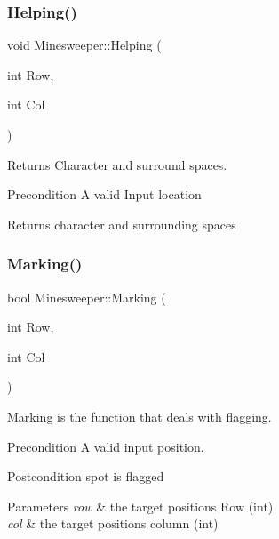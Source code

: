 \subsubsection{\texorpdfstring{Helping()}{Helping()}}
{\footnotesize\ttfamily void Minesweeper\+::\+Helping (\begin{DoxyParamCaption}\item[{int}]{Row,  }\item[{int}]{Col }\end{DoxyParamCaption})}



Returns Character and surround spaces. 

\begin{DoxyPrecond}{Precondition}
A valid Input location 
\end{DoxyPrecond}
\begin{DoxyReturn}{Returns}
character and surrounding spaces 
\end{DoxyReturn}
\mbox{\label{class_minesweeper_a8ac0c88846a50058ac722e4e9df5afaa}} 
\subsubsection{\texorpdfstring{Marking()}{Marking()}}
{\footnotesize\ttfamily bool Minesweeper\+::\+Marking (\begin{DoxyParamCaption}\item[{int}]{Row,  }\item[{int}]{Col }\end{DoxyParamCaption})}



Marking is the function that deals with flagging. 

\begin{DoxyPrecond}{Precondition}
A valid input position. 
\end{DoxyPrecond}
\begin{DoxyPostcond}{Postcondition}
spot is flagged 
\end{DoxyPostcond}

\begin{DoxyParams}{Parameters}
{\em row} & the target position\textquotesingle{}s Row (int) \\
\hline
{\em col} & the target position\textquotesingle{}s column (int) \\
\hline
\end{DoxyParams}
\mbox{\label{class_minesweeper_a8abe207bf94f14d33c10dc88410e6f8c}} 
